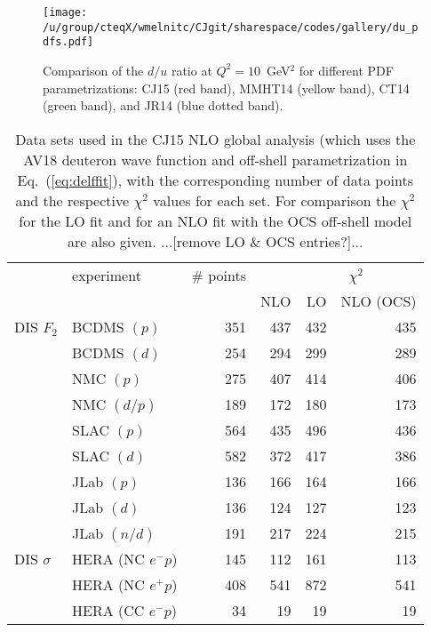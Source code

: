 \documentclass[aps,prd,amsmath,preprint]{revtex4}
\begin{document}
\begin{figure}[t]
\texttt{[image: /u/group/cteqX/wmelnitc/CJgit/sharespace/codes/gallery/du\_pdfs.pdf]}
\caption{Comparison of the $d/u$ ratio at $Q^2=10$~GeV$^2$ for different
	PDF parametrizations:
	CJ15 (red band),
	MMHT14 \cite{MMHT14} (yellow band),
	CT14 \cite{CT14} (green band), and
	JR14 \cite{JR14} (blue dotted band).}
\label{fig:du_pdfs}
\end{figure} 


\newpage
\begin{table}[t]
\caption{Data sets used in the CJ15 NLO global analysis (which uses
	the AV18 deuteron wave function and off-shell parametrization
	in Eq.~(\ref{eq:delffit}), with the corresponding number of
	data points and the respective $\chi^2$ values for each set.
	For comparison the $\chi^2$ for the LO fit and for an NLO
	fit with the OCS off-shell model are also given.
	{\color{red} ...[remove LO \& OCS entries?]...} \\}
\centering
{\scriptsize  
\begin{tabular}[c]{llrrrr}  \hline
  & experiment  & \# points\!\!\!\! & \multicolumn{3}{c}{\ \ \ \ \ $\chi^2$} \\
  & 		& 		    & NLO  & LO  & NLO (OCS) \\ \hline
DIS $F_2$
  & BCDMS $(p)$ 	\cite{BCDMS}    & 351 & 437 & 432 & 435 \\
  & BCDMS $(d)$ 	\cite{BCDMS}    & 254 & 294 & 299 & 289 \\
  & NMC   $(p)$   	\cite{NMCp}     & 275 & 407 & 414 & 406 \\
  & NMC   $(d/p)$ 	\cite{NMCdop}   & 189 & 172 & 180 & 173 \\
  & SLAC  $(p)$  	\cite{SLAC}     & 564 & 435 & 496 & 436 \\
  & SLAC  $(d)$  	\cite{SLAC}     & 582 & 372 & 417 & 386 \\
  & JLab  $(p)$  	\cite{Malace}   & 136 & 166 & 164 & 166 \\
  & JLab  $(d)$  	\cite{Malace}   & 136 & 124 & 127 & 123 \\
  & JLab  $(n/d)$	\cite{BONuS}  	& 191 & 217 & 224 & 215 \\
DIS $\sigma$
  & HERA (NC $e^-p$) 	\cite{HERA1}    & 145 & 112 & 161 & 113 \\
  & HERA (NC $e^+p$) 	\cite{HERA1}    & 408 & 541 & 872 & 541 \\
  & HERA (CC $e^-p$) 	\cite{HERA1}    &  34 &  19 &  19 &  19 \\

\end{tabular}}
\end{table}
\end{document}
